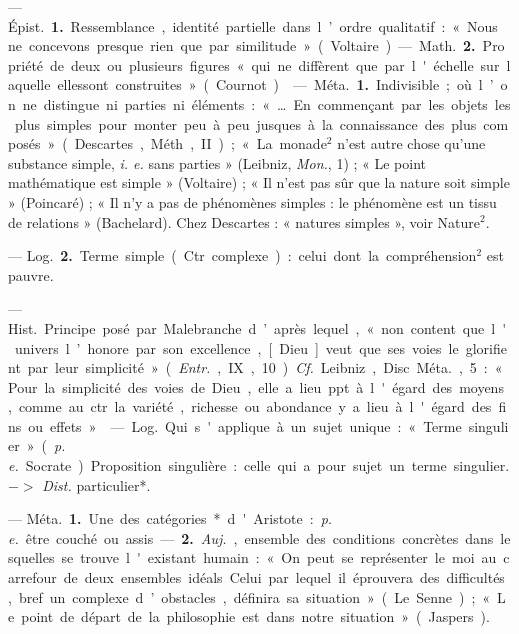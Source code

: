 \begin{itemize}[leftmargin=1cm, label=, itemsep=1pt]
 — \si{Épist.} {\bf 1.} Ressemblance,
identité partielle dans l’ordre qualitatif : « Nous ne concevons presque
rien que par similitude » (Voltaire).
— \si{Math.} {\bf 2.} Propriété de deux ou
plusieurs figures « qui ne diffèrent
que par l'échelle sur laquelle ellessont construites » (Cournot).

 — \si{Méta.} {\bf 1.} Indivisible; où l’on
ne distingue ni parties ni éléments :
« … En commençant par les objets
les plus simples... pour monter peu
à peu jusques à la connaissance
des plus composés » (Descartes,
Méth., II) ; « La monade$^2$ n’est autre
chose qu’une substance simple, {\it i. e.}
sans parties » (Leibniz, {\it Mon.}, 1) ;
« Le point mathématique est simple »
(Voltaire) ; « Il n’est pas sûr que la
nature soit simple » (Poincaré) ; « Il
n'y a pas de phénomènes simples :
le phénomène est un tissu de relations » (Bachelard). Chez Descartes :
« natures simples », voir Nature$^2$.

— \si{Log.} {\bf 2.} Terme simple (Ctr.
complexe) : celui dont la compréhension$^2$ est pauvre.

 — \si{Hist.} Principe
posé par Malebranche d’après lequel,
« non content que l'univers l’honore
par son excellence, [Dieu] veut que
ses voies le glorifient par leur simplicité » ({\it Entr.}, IX, 10). {\it Cf.} Leibniz,
Disc. \si{Méta.}, 5 : « Pour la simplicité
des voies de Dieu, elle a lieu ppt. à
l'égard des moyens, comme au ctr.
la variété, richesse ou abondance
y a lieu à l'égard des fins ou effets. »

 — \si{Log.} Qui s'applique à un
sujet unique : « Terme singulier »
({\it p. e.} Socrate). Proposition singulière :
celle qui a pour sujet un terme singulier. $->$ {\it Dist.} particulier*.

 — \si{Méta.} {\bf 1.} Une des catégories* d'Aristote : {\it p. e.} être couché
ou assis. — {\bf 2.} {\it Auj.}, ensemble des
conditions concrètes dans lesquelles
se trouve l'existant humain : « On
peut se représenter le moi au carrefour de deux ensembles idéals.
Celui par lequel il éprouvera des
difficultés, bref un complexe d’obstacles, définira sa situation » (Le
Senne) ; « Le point de départ de la
philosophie est dans notre situation »
(Jaspers).


\end{itemize}
